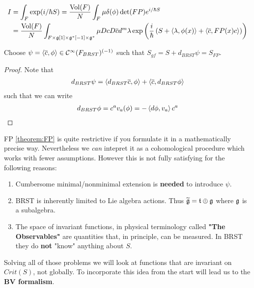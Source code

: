 \begin{theo}
\label{theorem:FP}
  \begin{align}
    I &= \int_F \exp(i/\hbar S) = \frac{\vol(F)}{N} \int_F \mu \delta(\phi) \det(FP) e^{i/\hbar S} \\
    &= \frac{\vol(F)}{N} \int_{F \times \gf[1] \times \gf^*[-1] \times \gf^*} \mu DcD\overline{c} d^m \lambda \exp\left( \frac{i}{\hbar} \left( S + \pair{\lambda}{\phi(x)} + \pair{\overline{c}}{FP(x) c} \right)\right)
  \end{align}
\end{theo}

\begin{theo}
\label{theorem:FP_BRST}
  Choose $\psi = \pair{\overline{c}}{\phi} \in \Ci(F_{BRST})^{(-1)}$ such that $S_{gf} = S + d_{BRST} \psi = S_{FP}$.
\begin{proof}
  Note that
  \begin{align*}
    d_{BRST} \psi = \pair{d_{BRST} \overline{c}}{\phi} + \pair{\overline{c}}{d_{BRST} \phi}
  \end{align*}
  such that we can write
  \begin{align*}
    d_{BRST} \phi = c^a v_a (\phi) = - \pair{d\phi}{v_a} c^a
  \end{align*}
\end{proof}
\end{theo}

\begin{rem}
  FP \ref{theorem:FP} is quite restrictive if you formulate it in a mathematically precise way. Nevertheless we \emph{can} intepret it as a cohomological procedure which works with fewer assumptions. However this is not fully satisfying for the following reasons:
  \begin{enumerate}
    \item Cumbersome minimal/nonminimal extension is \textbf{needed} to introduce $\psi$.
    \item BRST is inherently limited to Lie algebra actions. Thus $\widetilde{\mathfrak{g}} = \mathfrak{t} \oplus \mathfrak{g}$ where $\mathfrak{g}$ is a subalgebra.
    \item The space of invariant functions, in physical terminology called \textbf{"The Observables"} are quantities that, in principle, can be measured. In BRST they do \textbf{not} "know" anything about $S$.
  \end{enumerate}

  Solving all of those problems we will look at functions that are invariant on $Crit(S)$, not globally. To incorporate this idea from the start will lead us to the \textbf{BV formalism}.
\end{rem}


